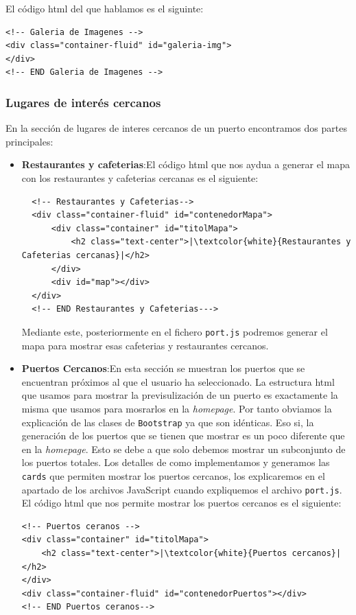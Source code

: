 \documentclass{article}
\begin{document}
\noindent El código html del que hablamos es el siguinte:
\begin{verbatim}
<!-- Galeria de Imagenes -->
<div class="container-fluid" id="galeria-img">
</div>
<!-- END Galeria de Imagenes -->
\end{verbatim}

\subsubsection{Lugares de interés cercanos}
En la sección de lugares de interes cercanos de un puerto encontramos dos partes principales:
\begin{itemize}
  \item \textbf{Restaurantes y cafeterias}:El código html que nos aydua a generar el mapa con los restaurantes y cafeterias cercanas es el siguiente:
  \begin{verbatim}
  <!-- Restaurantes y Cafeterias-->
  <div class="container-fluid" id="contenedorMapa">
      <div class="container" id="titolMapa">
          <h2 class="text-center">|\textcolor{white}{Restaurantes y Cafeterias cercanas}|</h2>
      </div>
      <div id="map"></div>
  </div>
  <!-- END Restaurantes y Cafeterias--->
  \end{verbatim}
  Mediante este, posteriormente en el fichero \texttt{port.js} podremos generar el mapa para mostrar esas cafeterias y restaurantes cercanos.
  \item \textbf{Puertos Cercanos}:En esta sección se muestran los puertos que se encuentran próximos al que el usuario ha seleccionado. La estructura html que usamos para mostrar la previsulización de un puerto es exactamente la misma que usamos para mosrarlos en la \textit{homepage}. Por tanto obviamos la explicación de las clases de \texttt{Bootstrap} ya que son idénticas. Eso si, la generación de los puertos que se tienen que mostrar es un poco diferente que en la \textit{homepage}. Esto se debe a que solo debemos mostrar un subconjunto de los puertos totales. Los detalles de como implementamos y generamos las \texttt{cards} que permiten mostrar los puertos cercanos, los explicaremos en el apartado de los archivos JavaScript cuando expliquemos el archivo \texttt{port.js}.\\

\noindent El código html que nos permite mostrar los puertos cercanos es el siguiente:
\begin{verbatim}
<!-- Puertos ceranos -->
<div class="container" id="titolMapa">
    <h2 class="text-center">|\textcolor{white}{Puertos cercanos}|</h2>
</div>
<div class="container-fluid" id="contenedorPuertos"></div>
<!-- END Puertos ceranos-->
\end{verbatim}
\end{itemize}
\end{document}
